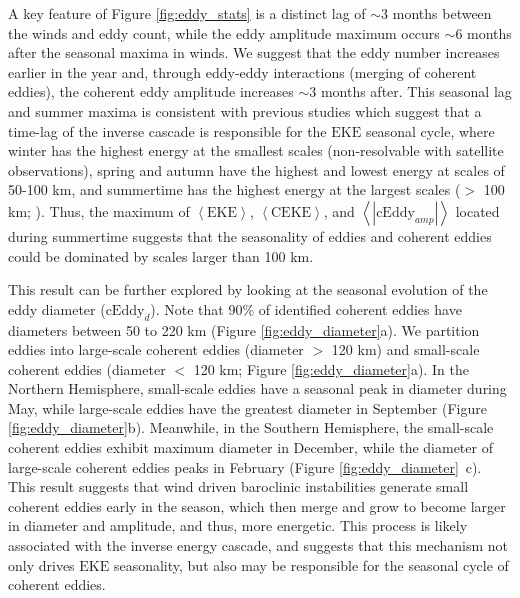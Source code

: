 \documentclass[draft,linenumbers]{agujournal2019}
\newcommand{\EKE}{\textrm{EKE}}
\newcommand{\CEKE}{\textrm{CEKE}}
\newcommand{\cEddy}{\textrm{cEddy}}
\begin{document}
	A key feature of Figure \ref{fig:eddy_stats} is a distinct lag of $\sim$3 months between the winds and eddy count, while the eddy amplitude maximum occurs $\sim$6 months after the seasonal maxima in winds. 
	We suggest that the eddy number increases earlier in the year and, through eddy-eddy interactions (merging of coherent eddies), the coherent eddy amplitude increases $\sim$3 months after. This seasonal lag and summer maxima is consistent with previous studies which suggest that a time-lag of the inverse cascade \citep{Sasaki_seasonal_2014, Qiu_seasonal_2014} is responsible for the $\EKE$ seasonal cycle, where winter has the highest energy at the smallest scales (non-resolvable with satellite observations), spring and autumn have the highest and lowest energy at scales of 50-100 km, and summertime has the highest energy at the largest scales ($>$ 100 km; \citealp{Uchida_Seasonality_2017}). 
	Thus, the maximum of $\left<\EKE\right>$, $\left<\CEKE\right>$, and $\left<|\cEddy_{amp}|\right>$ located during summertime suggests that the seasonality of eddies and coherent eddies could be dominated by scales larger than 100 km.

	This result can be further explored by looking at the seasonal evolution of the eddy diameter ($\cEddy_d$). 
	Note that 90\% of identified coherent eddies have diameters between 50 to 220 km (Figure \ref{fig:eddy_diameter}a). We partition eddies into large-scale coherent eddies (diameter $>$ 120 km) and  small-scale coherent eddies (diameter $<$ 120 km; Figure \ref{fig:eddy_diameter}a). 
	In the Northern Hemisphere, small-scale eddies have a seasonal peak in diameter during May, while large-scale eddies have the greatest diameter in September (Figure \ref{fig:eddy_diameter}b).
	Meanwhile, in the Southern Hemisphere, the small-scale coherent eddies exhibit maximum diameter in December, while the diameter of large-scale coherent eddies peaks in February (Figure \ref{fig:eddy_diameter}~c). 
	This result suggests that wind driven baroclinic instabilities generate small coherent eddies early in the season, which then merge and grow to become larger in diameter and amplitude, and thus, more energetic. 
	This process is likely associated with the inverse energy cascade, and suggests that this mechanism not only drives $\EKE$ seasonality, but also may be responsible for the seasonal cycle of coherent eddies. 
\end{document}
